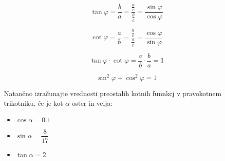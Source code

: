                         $$\displaystyle \tan\varphi=\dfrac{b}{a}=\dfrac{\frac{a}{c}}{\frac{b}{c}}=\dfrac{\sin\varphi}{\cos\varphi}$$
                    

                    
                        $$\displaystyle \cot\varphi=\dfrac{a}{b}=\dfrac{\frac{b}{c}}{\frac{a}{c}}=\dfrac{\cos\varphi}{\sin\varphi}$$
                    

                    
                        $$\displaystyle \tan\varphi\cdot\cot\varphi=\dfrac{a}{b}\cdot\dfrac{b}{a}=1$$
                    

                    
                        
                            $$\sin^2\varphi+\cos^2\varphi =1$$
                    

        



        
            \begin{naloga}
                Natančno izračunajte vrednosti preostalih kotnih funnkcj v pravokotnem trikotniku, če je kot $\alpha$ oster in velja:
                \begin{itemize}
                    \item $\cos\alpha=0.1$ 
                    \item $\sin\alpha=\dfrac{8}{17}$ 
                    \item $\tan\alpha=2$ 
                \end{itemize}
            \end{naloga}

        


